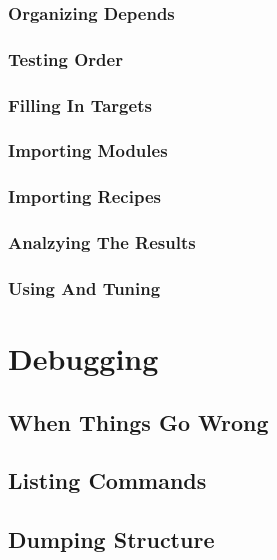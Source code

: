 \subsection{Organizing Depends}


\subsection{Testing Order}


\subsection{Filling In Targets}


\subsection{Importing Modules}


\subsection{Importing Recipes}


\subsection{Analzying The Results}


\subsection{Using And Tuning}



\chapter{Debugging}
\label{chapter:Debugging}



\section{When Things Go Wrong}


\section{Listing Commands}


\section{Dumping Structure}


